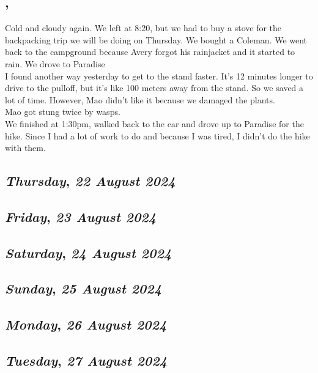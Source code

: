 \subsection*{\weekday, \day}
Cold and cloudy again. We left at 8:20, but we had to buy a stove for the backpacking trip we will be doing on Thursday. We bought a Coleman. We went back to the campground because Avery forgot his rainjacket and it started to rain. We drove to Paradise\\
I found another way yesterday to get to the stand faster. It's 12 minutes longer to drive to the pulloff, but it's like 100 meters away from the stand. So we saved a lot of time. However, Mao didn't like it because we damaged the plants.\\
Mao got stung twice by wasps.\\
We finished at 1:30pm, walked back to the car and drove up to Paradise for the hike. Since I had a lot of work to do and because I was tired, I didn't do the hike with them. 

\def\day{\textit{22 August 2024}}
\def\weekday{\textit{Thursday}}
\subsection*{\weekday, \day}

\def\day{\textit{23 August 2024}}
\def\weekday{\textit{Friday}}
\subsection*{\weekday, \day}

\def\day{\textit{24 August 2024}}
\def\weekday{\textit{Saturday}}
\subsection*{\weekday, \day}

\def\day{\textit{25 August 2024}}
\def\weekday{\textit{Sunday}}
\subsection*{\weekday, \day}

\def\day{\textit{26 August 2024}}
\def\weekday{\textit{Monday}}
\subsection*{\weekday, \day}

\def\day{\textit{27 August 2024}}
\def\weekday{\textit{Tuesday}}
\subsection*{\weekday, \day}

